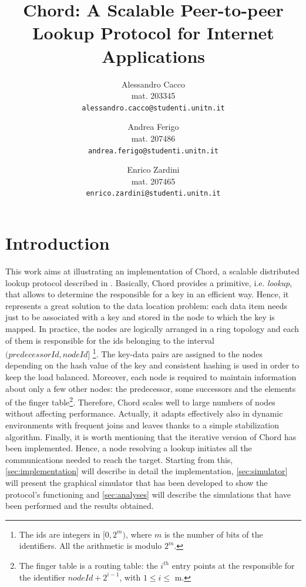 \documentclass[11pt,twocolumn,letterpaper]{article}
\begin{document}
	
	\title{Chord: A Scalable Peer-to-peer Lookup Protocol for Internet Applications}
	
	\author{Alessandro Cacco\\
		mat. 203345\\
		{\tt\small alessandro.cacco@studenti.unitn.it}
		\and
		Andrea Ferigo\\
		mat. 207486\\
		{\tt\small andrea.ferigo@studenti.unitn.it}
		\and
		Enrico Zardini\\
		mat. 207465\\
		{\tt\small enrico.zardini@studenti.unitn.it}
	}
	\date{}
	\maketitle
	
	\section{Introduction}
	\label{sec:intro}
	This work aims at illustrating an implementation of Chord, a scalable distributed lookup protocol described in \cite{chord}. Basically, Chord provides a primitive, i.e. \textit{lookup}, that allows to determine the responsible for a key in an efficient way. Hence, it represents a great solution to the data location problem: each data item needs just to be associated with a key and stored in the node to which the key is mapped. \newline 
	In practice, the nodes are logically arranged in a ring topology and each of them is responsible for the ids belonging to the interval $(predecessorId, nodeId]$ \footnote{The ids are integers in $[0,2^m)$, where $m$ is the number of bits of the identifiers. All the arithmetic is modulo $2^m$.}. The key-data pairs are assigned to the nodes depending on the hash value of the key and consistent hashing is used in order to keep the load balanced. Moreover, each node is required to maintain information about only a few other nodes: the predecessor, some successors and the elements of the finger table\footnote{The finger table is a routing table: the $i^{th}$ entry points at the responsible for the identifier $nodeId+2^{i-1}$, with $1\leq i \leq$ m.\label{foot:ftable}}. Therefore, Chord scales well to large numbers of nodes without affecting performance. Actually, it adapts effectively also in dynamic environments with frequent joins and leaves thanks to a simple stabilization algorithm. \newline
	Finally, it is worth mentioning that the iterative version of Chord has been implemented. Hence, a node resolving a lookup initiates all the communications needed to reach the target. \newline
	Starting from this, \cref{sec:implementation} will describe in detail the implementation, \cref{sec:simulator} will present the graphical simulator that has been developed to show the protocol's functioning and \cref{sec:analyses} will describe the simulations that have been performed and the results obtained. 
	
\end{document}
